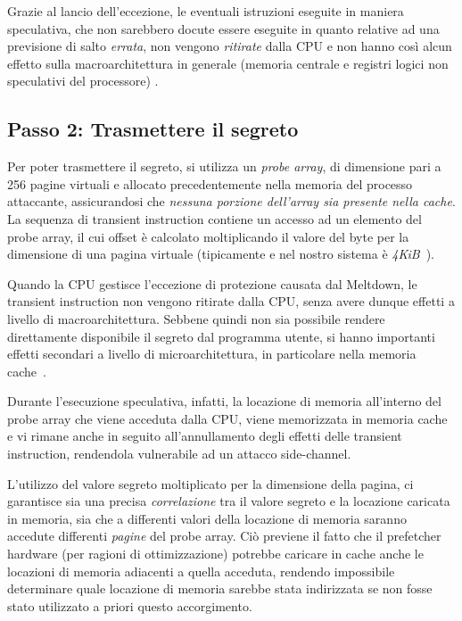 Grazie al lancio dell'eccezione, le eventuali istruzioni eseguite in maniera speculativa, che non sarebbero docute essere eseguite in quanto relative ad una previsione di salto \emph{errata}, non vengono \emph{ritirate} dalla CPU e non hanno così alcun effetto sulla macroarchitettura in generale (memoria centrale e registri logici non speculativi del processore) \cite{frosini:calcolatori2}.

\subsection{Passo 2: Trasmettere il segreto}
\label{sec:meltdown-passo-2}
Per poter trasmettere il segreto, si utilizza un \emph{probe array}, di dimensione pari a 256 pagine virtuali e allocato precedentemente nella memoria del processo attaccante, assicurandosi che \emph{nessuna porzione dell'array sia presente nella cache}. 
La sequenza di transient instruction contiene un accesso ad un elemento del probe array, il cui offset è calcolato moltiplicando il valore del byte per la dimensione di una pagina virtuale (tipicamente e nel nostro sistema  è \emph{4KiB}~\cite{lettieri:paginazione}).

Quando la CPU gestisce l'eccezione di protezione causata dal Meltdown, le transient instruction non vengono ritirate dalla CPU, senza avere dunque effetti a livello di macroarchitettura. Sebbene quindi non sia possibile rendere direttamente disponibile il segreto dal programma utente, si hanno importanti effetti secondari a livello di microarchitettura, in particolare nella memoria cache~\cite{lipp:meltdown}.

Durante l'esecuzione speculativa, infatti, la locazione di memoria all'interno del probe array che viene acceduta dalla CPU, viene memorizzata in memoria cache e vi rimane anche in seguito all'annullamento degli effetti delle transient instruction, rendendola vulnerabile ad un attacco side-channel.

L'utilizzo del valore segreto moltiplicato per la dimensione della pagina, ci garantisce sia una precisa \emph{correlazione} tra il valore segreto e la locazione caricata in memoria, sia che a differenti valori della locazione di memoria saranno accedute differenti \emph{pagine} del probe array.
Ciò previene il fatto che il prefetcher hardware (per ragioni di ottimizzazione) potrebbe caricare in cache anche le locazioni di memoria adiacenti a quella acceduta, rendendo impossibile determinare quale locazione di memoria sarebbe stata indirizzata se non fosse stato utilizzato a priori questo accorgimento.

